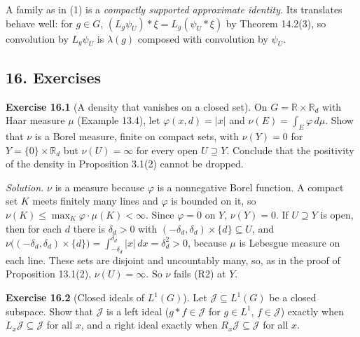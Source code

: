 \documentclass[
  english,
  11pt,
  a4paper,
]{article}
\begin{document}
A family as in (1) is a \emph{compactly supported approximate identity}.
Its translates behave well: for \(g\in G\),
\((L_g\psi_U)*\xi=L_g(\psi_U*\xi)\) by Theorem 14.2(3), so convolution
by \(L_g\psi_U\) is \(\lambda(g)\) composed with convolution by
\(\psi_U\).

\subsection{16.
Exercises}\label{haar-measure-on-locally-compact-groups--16-exercises}

\textbf{Exercise 16.1} (A density that vanishes on a closed set). On
\(G=\mathbb R\times\mathbb R_d\) with Haar measure \(\mu\) (Example
13.4), let \(\varphi(x,d)=|x|\) and \(\nu(E)=\int_E\varphi\,d\mu\). Show
that \(\nu\) is a Borel measure, finite on compact sets, with
\(\nu(Y)=0\) for \(Y=\{0\}\times\mathbb R_d\) but \(\nu(U)=\infty\) for
every open \(U\supseteq Y\). Conclude that the positivity of the density
in Proposition 3.1(2) cannot be dropped.

\emph{Solution.} \(\nu\) is a measure because \(\varphi\) is a
nonnegative Borel function. A compact set \(K\) meets finitely many
lines and \(\varphi\) is bounded on it, so
\(\nu(K)\leq\max_K\varphi\cdot\mu(K)<\infty\). Since \(\varphi=0\) on
\(Y\), \(\nu(Y)=0\). If \(U\supseteq Y\) is open, then for each \(d\)
there is \(\delta_d>0\) with
\((-\delta_d,\delta_d)\times\{d\}\subseteq U\), and
\(\nu\big((-\delta_d,\delta_d)\times\{d\}\big)=\int_{-\delta_d}^{\delta_d}|x|\,dx=\delta_d^2>0\),
because \(\mu\) is Lebesgue measure on each line. These sets are
disjoint and uncountably many, so, as in the proof of Proposition
13.1(2), \(\nu(U)=\infty\). So \(\nu\) fails (R2) at \(Y\).

\textbf{Exercise 16.2} (Closed ideals of \(L^1(G)\)). Let
\(\mathcal J\subseteq L^1(G)\) be a closed subspace. Show that
\(\mathcal J\) is a left ideal (\(g*f\in\mathcal J\) for \(g\in L^1\),
\(f\in\mathcal J\)) exactly when \(L_x\mathcal J\subseteq\mathcal J\)
for all \(x\), and a right ideal exactly when
\(R_x\mathcal J\subseteq\mathcal J\) for all \(x\).
\end{document}
